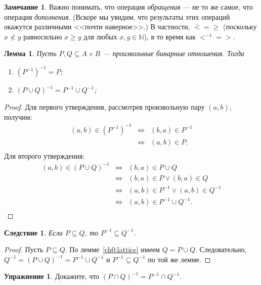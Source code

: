\documentclass[12pt,notitlepage]{article}
\theoremstyle{plain}
\newtheorem{lemma}[thm]{Лемма}
\newtheorem{corr}[thm]{Следствие}
\theoremstyle{definition}
\newtheorem{exc}[thm]{Упражнение}
\newtheorem{rem}[thm]{Замечание}
\theoremstyle{plain}
\newcommand{\N}{\mathbb{N}}
\newcommand{\sbs}{\subseteq}
\newcommand{\1}{\mathbf{1}}
\newcommand{\0}{\mathbf{0}}
\newcommand{\mcomm}[1]{}
\begin{document}
\begin{rem}
	Важно понимать, что операция \emph{обращения} --- не то же самое, что операция \emph{дополнения}. (Вскоре мы увидим, что результаты этих операций окажутся различными <<почти наверное>>.) В частности, ${\bar <} = {\geq}$ (поскольку $x \not< y$ равносильно $x \geq y$ для любых $x, y \in \N$), в то время как ${<}^{-1} = {>}$.
\end{rem}
\mcomm{In my experience, the students often confuse the two.}

\begin{lemma} Пусть $P, Q \sbs A \times B$ --- произвольные бинарные отношения. Тогда
	\begin{enumerate}
		\item $(P^{-1})^{-1} = P$;
		\item $(P \cup Q)^{-1} = P^{-1} \cup Q^{-1}$;
	\end{enumerate}
\end{lemma}
\begin{proof}
	Для первого утверждения, рассмотрев произвольную пару $(a,b)$, получим:
	$$
	\begin{array}{rcl}
		(a, b) \in (P^{-1})^{-1} &\iff& (b,a) \in P^{-1}\\
		&\iff&  (a,b) \in P.\\
	\end{array}
	$$
	Для второго утверждения: 
	$$
	\begin{array}{rcl}
		(a, b) \in (P \cup Q)^{-1} &\iff& (b,a) \in P \cup Q\\
		&\iff& (b,a) \in P \vee (b,a) \in Q\\
		&\iff& (a,b) \in P^{-1} \vee (a,b) \in Q^{-1}\\
		&\iff& (a,b) \in P^{-1} \cup Q^{-1}.\\
	\end{array}
	$$
\end{proof}
\begin{corr}
	Если $P \sbs Q$, то $P^{-1} \sbs Q^{-1}$.
\end{corr}
\begin{proof}
	Пусть $P \sbs Q$. По лемме~\ref{ch0:lattice} имеем $Q = P \cup Q$. Следовательно,
	$Q^{-1} = (P \cup Q)^{-1} = P^{-1} \cup Q^{-1}$
	и $P^{-1} \sbs Q^{-1}$ по той же лемме.
\end{proof}

\begin{exc}
	Докажите, что $(P \cap Q)^{-1} = P^{-1} \cap Q^{-1}$.
\end{exc}
\end{document}
